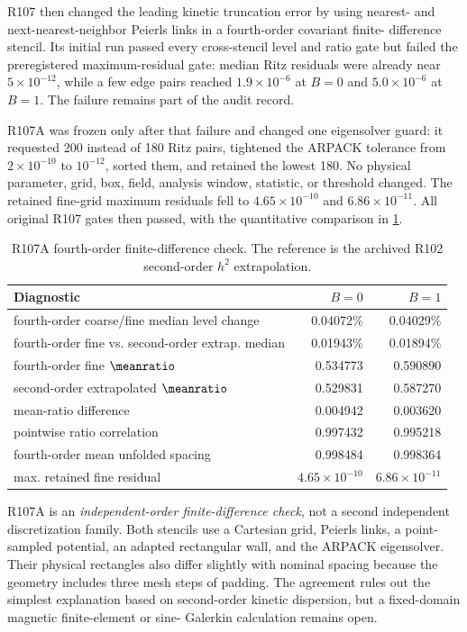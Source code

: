 R107 then changed the leading kinetic truncation error by using nearest- and
next-nearest-neighbor Peierls links in a fourth-order covariant finite-
difference stencil.  Its initial run passed every cross-stencil level and
ratio gate but failed the preregistered maximum-residual gate: median Ritz
residuals were already near \(5\times10^{-12}\), while a few edge pairs
reached \(1.9\times10^{-6}\) at \(B=0\) and \(5.0\times10^{-6}\) at
\(B=1\).  The failure remains part of the audit record.

R107A was frozen only after that failure and changed one eigensolver guard:
it requested 200 instead of 180 Ritz pairs, tightened the ARPACK tolerance
from \(2\times10^{-10}\) to \(10^{-12}\), sorted them, and retained the
lowest 180.  No physical parameter, grid, box, field, analysis window,
statistic, or threshold changed.  The retained fine-grid maximum residuals
fell to \(4.65\times10^{-10}\) and \(6.86\times10^{-11}\).  All original
R107 gates then passed, with the quantitative comparison in
\cref{tab:fourth-order-check}.

\begin{table}[t]
 \centering
 \caption{R107A fourth-order finite-difference check.  The reference is the
 archived R102 second-order \(h^2\) extrapolation.}
 \label{tab:fourth-order-check}
 \small
 \begin{tabular}{@{}lrr@{}}
 \toprule
 Diagnostic & \(B=0\) & \(B=1\) \\
 \midrule
 fourth-order coarse/fine median level change & 0.04072\% & 0.04029\% \\
 fourth-order fine vs. second-order extrap. median & 0.01943\% & 0.01894\% \\
 fourth-order fine \(\meanratio\) & 0.534773 & 0.590890 \\
 second-order extrapolated \(\meanratio\) & 0.529831 & 0.587270 \\
 mean-ratio difference & 0.004942 & 0.003620 \\
 pointwise ratio correlation & 0.997432 & 0.995218 \\
 fourth-order mean unfolded spacing & 0.998484 & 0.998364 \\
 max. retained fine residual & \(4.65\times10^{-10}\) & \(6.86\times10^{-11}\) \\
 \bottomrule
 \end{tabular}
\end{table}

R107A is an \emph{independent-order finite-difference check}, not a second
independent discretization family.  Both stencils use a Cartesian grid,
Peierls links, a point-sampled potential, an adapted rectangular wall, and
the ARPACK eigensolver.  Their physical rectangles also differ slightly with
nominal spacing because the geometry includes three mesh steps of padding.
The agreement rules out the simplest explanation based on second-order
kinetic dispersion, but a fixed-domain magnetic finite-element or sine-
Galerkin calculation remains open.

